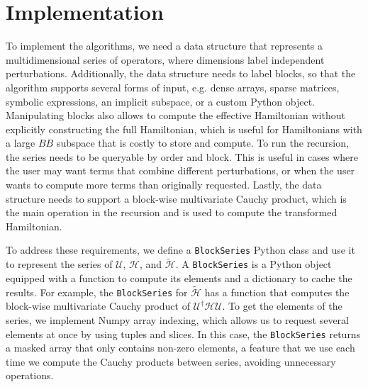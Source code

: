 \section{Implementation}

To implement the algorithms, we need a data structure that represents a
multidimensional series of operators, where dimensions label independent
perturbations.
Additionally, the data structure needs to label blocks, so that the algorithm
supports several forms of input, e.g. dense arrays, sparse matrices, symbolic
expressions, an implicit subspace, or a custom Python object.
Manipulating blocks also allows to compute the effective Hamiltonian without
explicitly constructing the full Hamiltonian, which is useful for Hamiltonians
with a large $BB$ subspace that is costly to store and compute.
To run the recursion, the series needs to be queryable by order and block.
This is useful in cases where the user may want terms that combine different
perturbations, or when the user wants to compute more terms than originally
requested.
Lastly, the data structure needs to support a block-wise multivariate Cauchy
product, which is the main operation in the recursion and is used to compute
the transformed Hamiltonian.

To address these requirements, we define a \texttt{BlockSeries} Python class and use
it to represent the series of $\mathcal{U}$, $\mathcal{H}$, and
$\tilde{\mathcal{H}}$.
A \texttt{BlockSeries} is a Python object equipped with a function to compute its
elements and a dictionary to cache the results.
For example, the \texttt{BlockSeries} for $\tilde{\mathcal{H}}$ has a function that
computes the block-wise multivariate Cauchy product of $\mathcal{U}^{\dagger}
\mathcal{H} \mathcal{U}$.
To get the elements of the series, we implement Numpy array indexing,
which allows us to request several elements at once by using tuples and slices.
In this case, the \texttt{BlockSeries} returns a masked array that only contains
non-zero elements, a feature that we use each time we compute the Cauchy
products between series, avoiding unnecessary operations.

